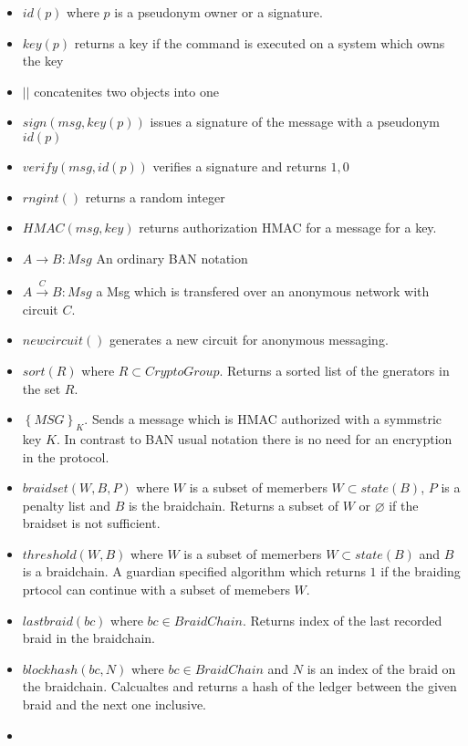 \documentclass[12pt]{article}
\begin{document}
\begin{itemize}
\item $id(p)$ where $p$ is a pseudonym owner or a signature.
\item $key(p)$ returns a key if the command is executed on a system which owns the key
\item $||$ concatenites two objects into one
\item $sign(msg, key(p))$ issues a signature of the message with a pseudonym $id(p)$
\item $verify(msg, id(p))$ verifies a signature and returns ${1, 0}$ 
\item $rngint()$ returns a random integer
\item $HMAC(msg, key)$ returns authorization HMAC for a message for a key.
\item $A \to B: Msg$ An ordinary BAN notation
\item $A \overset{C}{\to} B: Msg$ a Msg which is transfered over an anonymous network with circuit $C$.
\item $newcircuit()$ generates a new circuit for anonymous messaging.
\item $sort(R)$ where $R \subset CryptoGroup$. Returns a sorted list of the gnerators in the set $R$.
\item $\left\{ MSG \right\}_K$. Sends a message which is HMAC authorized with a symmstric key $K$. In contrast to BAN usual notation there is no need for an encryption in the protocol.
\item $braidset(W, B, P)$ where $W$ is a subset of memerbers $W \subset state(B)$, $P$ is a penalty list and $B$ is the braidchain. Returns a subset of $W$ or $\varnothing$ if the braidset is not sufficient.
\item $threshold(W, B)$ where $W$ is a subset of memerbers $W \subset state(B)$ and $B$ is a braidchain. A guardian specified algorithm which returns $1$ if the braiding prtocol can continue with a subset of memebers $W$.
\item $lastbraid(bc)$ where $bc \in BraidChain$. Returns index of the last recorded braid in the braidchain.
\item $blockhash(bc, N)$ where $bc \in BraidChain$ and $N$ is an index of the braid on the braidchain. Calcualtes and returns a hash of the ledger between the given braid and the next one inclusive.
\item 

\end{itemize}
\end{document}

